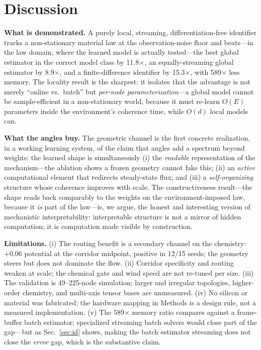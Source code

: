 \documentclass[11pt]{article}
\begin{document}
\section{Discussion}
\textbf{What is demonstrated.} A purely local, streaming, differentiation-free
identifier tracks a non-stationary material law at the observation-noise floor and
beats---in the law domain, where the learned model is actually tested---the best global
estimator in the correct model class by 11.8$\times$, an equally-streaming global
estimator by 8.9$\times$, and a finite-difference identifier by 15.3$\times$, with
589$\times$ less memory. The locality result is the sharpest: it isolates that the
advantage is not merely ``online vs.\ batch'' but \emph{per-node parameterization}---a
global model cannot be sample-efficient in a non-stationary world, because it must
re-learn $O(E)$ parameters inside the environment's coherence time, while $O(d)$ local
models can.

\textbf{What the angles buy.} The geometric channel is the first concrete realization,
in a working learning system, of the claim that angles add a spectrum beyond weights:
the learned shape is simultaneously (i) the \emph{readable} representation of the
mechanism---the ablation shows a frozen geometry cannot fake this; (ii) an
\emph{active} computational element that redirects steady-state flux; and (iii) a
\emph{self-organizing} structure whose coherence improves with scale. The
constructiveness result---the shape reads back comparably to the weights on the
environment-imposed law, because it \emph{is} part of the law---is, we argue, the
honest and interesting version of mechanistic interpretability: interpretable structure
is not a mirror of hidden computation; it is computation made visible by construction.

\textbf{Limitations.} (i) The routing benefit is a secondary channel on the chemistry:
$+0.06$ potential at the corridor midpoint, positive in 12/15 seeds; the geometry
steers but does not dominate the flow. (ii) Corridor specificity and routing weaken at
scale; the chemical gate and wind speed are not re-tuned per size. (iii) The validation
is 49--225-node simulation; larger and irregular topologies, higher-order chemistry, and
multi-axis tensor bases are unmeasured. (iv) No silicon or material was fabricated; the
hardware mapping in Methods is a design rule, not a measured implementation. (v) The
589$\times$ memory ratio compares against a frame-buffer batch estimator; specialized
streaming batch solvers would close part of the gap---but as Sec.~\ref{sec:id} shows,
making the batch estimator streaming does not close the \emph{error} gap, which is the
substantive claim.
\end{document}
